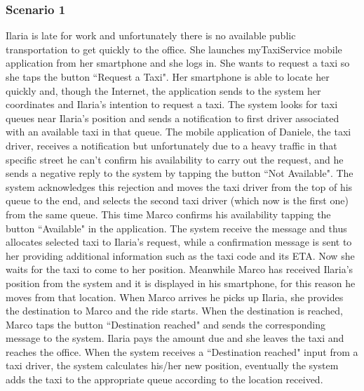 \documentclass[a4paper,12pt]{article}%
\begin{document}
\subsubsection{Scenario 1}
Ilaria is late for work and unfortunately there is no available public transportation to get quickly to the office. She launches myTaxiService mobile application from her smartphone and she logs in.
She wants to request a taxi so she taps the button ``Request a Taxi".
Her smartphone is able to locate her quickly and, though the Internet, the application sends to the system her coordinates and Ilaria's intention to request a taxi. The system looks for taxi queues near Ilaria's position and sends a notification to first driver associated with an available taxi in that queue.
The mobile application of Daniele, the taxi driver, receives a notification but unfortunately due to a heavy traffic in that specific street he can't confirm his availability to carry out the request, and he sends a negative reply to the system by tapping the button ``Not Available".
The system acknowledges this rejection and moves the taxi driver from the top of his queue to the end, and selects the second taxi driver (which now is the first one) from the same queue.
This time Marco confirms his availability tapping the button ``Available" in the application. The system receive the message and thus allocates selected taxi to Ilaria's request, while a confirmation message is sent to her providing additional information such as the taxi code and its ETA. Now she waits for the taxi to come to her position.
Meanwhile Marco has received Ilaria's position from the system and it is displayed in his smartphone, for this reason he moves from that location.
When Marco arrives he picks up Ilaria, she provides the destination to Marco and the ride starts.
When the destination is reached, Marco taps the button ``Destination reached" and sends the corresponding message to the system. Ilaria pays the amount due and she leaves the taxi and reaches the office. When the system receives a ``Destination reached" input from a taxi driver, the system calculates his/her new position, eventually the system adds the taxi to the appropriate queue according to the location received.
\end{document}
